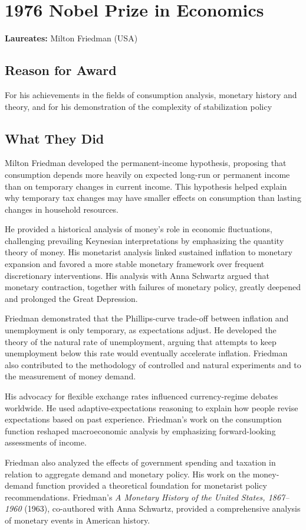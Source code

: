 \chapter{1976 Nobel Prize in Economics}
\textbf{Laureates: }Milton Friedman (USA)

\section*{Reason for Award}
For his achievements in the fields of consumption analysis, monetary history and theory, and for
his demonstration of the complexity of stabilization policy

\section{What They Did}
Milton Friedman developed the permanent-income hypothesis, proposing that consumption depends
more heavily on expected long-run or permanent income than on temporary changes in current income.
This hypothesis helped explain why temporary tax changes may have smaller effects on consumption
than lasting changes in household resources.

He provided a historical analysis of money's role in economic fluctuations, challenging prevailing
Keynesian interpretations by emphasizing the quantity theory of money. His monetarist analysis
linked sustained inflation to monetary expansion and favored a more stable monetary framework over
frequent discretionary interventions. His analysis with Anna Schwartz argued that monetary
contraction, together with failures of monetary policy, greatly deepened and prolonged the Great
Depression.

Friedman demonstrated that the Phillips-curve trade-off between inflation and unemployment is only
temporary, as expectations adjust. He developed the theory of the natural rate of unemployment,
arguing that attempts to keep unemployment below this rate would eventually accelerate inflation.
Friedman also contributed to the methodology of controlled and natural experiments and to the
measurement of money demand.

His advocacy for flexible exchange rates influenced currency-regime debates worldwide. He used
adaptive-expectations reasoning to explain how people revise expectations based on past experience.
Friedman's work on the consumption function reshaped macroeconomic analysis by emphasizing
forward-looking assessments of income.

Friedman also analyzed the effects of government spending and taxation in relation to aggregate
demand and monetary policy. His work on the money-demand function provided a theoretical foundation
for monetarist policy recommendations. Friedman's \textit{A Monetary History of the United States,
1867--1960} (1963), co-authored with Anna Schwartz, provided a comprehensive analysis of monetary
events in American history.

